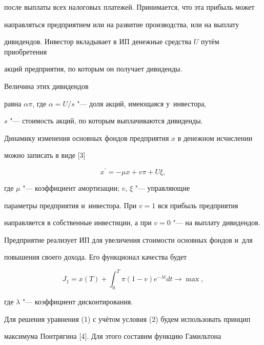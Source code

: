 после выплаты всех налоговых платежей. Принимается, что эта прибыль может 

направляться предприятием или на развитие производства, или на выплату 

дивидендов. Инвестор вкладывает в ИП денежные средства $U$ путём приобретения 

акций предприятия, по которым он получает дивиденды. 

Величина этих дивидендов 

равна $\alpha\pi$, где $\alpha=U/s$  "---  доля акций, имеющаяся у~инвестора, 

$s$ "--- стоимость акций, по которым выплачиваются дивиденды. 



Динамику изменения основных фондов предприятия $x$ в денежном исчислении 

можно записать в виде [3]

\begin{equation}

\label{f1}

x^\prime=-\mu x+v\pi+U \xi,

\end{equation}



\noindent где $\mu$ "--- коэффициент амортизации; $v$, $\xi$ "--- управляющие 

параметры предприятия и~инвестора. При $v=1$ вся прибыль предприятия 

направляется в собственные инвестиции, а при $v=0$ "--- на выплату дивидендов. 

Предприятие реализует ИП для увеличения стоимости основных фондов и~для 

повышения своего дохода. Его функционал качества будет



\begin{equation}

\label{f2}

J_1=x(T)+\int_{0}^{T}\pi(1-v)e^{-\lambda t}dt\to \max,

\end{equation}



\noindent где  $\lambda$ "--- коэффициент дисконтирования.



Для решения уравнения (1) с учётом условия (2) будем использовать принцип 

максимума Понтрягина [4]. Для этого составим функцию Гамильтона



